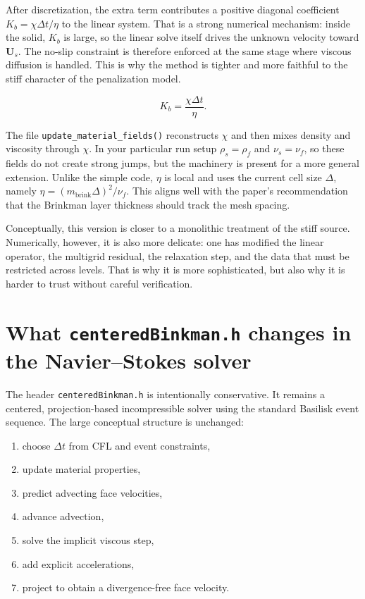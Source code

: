 \documentclass[11pt,a4paper]{article}
\begin{document}
After discretization, the extra term contributes a positive diagonal coefficient $K_b=\chi\Delta t/\eta$ to the linear system. That is a strong numerical mechanism: inside the solid, $K_b$ is large, so the linear solve itself drives the unknown velocity toward $\bm{U}_s$. The no-slip constraint is therefore enforced at the same stage where viscous diffusion is handled. This is why the method is tighter and more faithful to the stiff character of the penalization model.

\begin{equation}
K_b = \frac{\chi\Delta t}{\eta}.
\end{equation}

The file \texttt{update\_material\_fields()} reconstructs $\chi$ and then mixes density and viscosity through $\chi$. In your particular run setup $\rho_s=\rho_f$ and $\nu_s=\nu_f$, so these fields do not create strong jumps, but the machinery is present for a more general extension. Unlike the simple code, $\eta$ is local and uses the current cell size $\Delta$, namely $\eta=(m_{\mathrm{brink}}\Delta)^2/\nu_f$. This aligns well with the paper's recommendation that the Brinkman layer thickness should track the mesh spacing.

Conceptually, this version is closer to a monolithic treatment of the stiff source. Numerically, however, it is also more delicate: one has modified the linear operator, the multigrid residual, the relaxation step, and the data that must be restricted across levels. That is why it is more sophisticated, but also why it is harder to trust without careful verification.

\section{What \texttt{centeredBinkman.h} changes in the Navier--Stokes solver}

The header \texttt{centeredBinkman.h} is intentionally conservative. It remains a centered, projection-based incompressible solver using the standard Basilisk event sequence. The large conceptual structure is unchanged:
\begin{enumerate}[leftmargin=1.8em]
\item choose $\Delta t$ from CFL and event constraints,
\item update material properties,
\item predict advecting face velocities,
\item advance advection,
\item solve the implicit viscous step,
\item add explicit accelerations,
\item project to obtain a divergence-free face velocity.
\end{enumerate}
\end{document}
